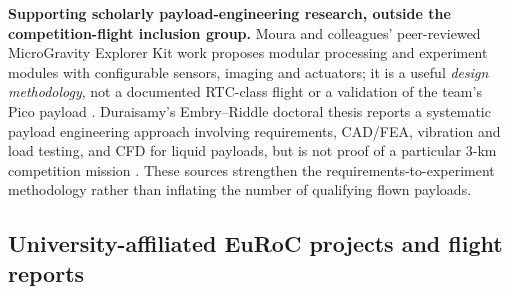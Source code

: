\documentclass[10pt,a4paper]{article}
\begin{document}
\textbf{Supporting scholarly payload-engineering research, outside the competition-flight inclusion group.} Moura and colleagues' peer-reviewed MicroGravity Explorer Kit work proposes modular processing and experiment modules with configurable sensors, imaging and actuators; it is a useful \emph{design methodology}, not a documented RTC-class flight or a validation of the team's Pico payload \cite{moura2024mgx}. Duraisamy's Embry--Riddle doctoral thesis reports a systematic payload engineering approach involving requirements, CAD/FEA, vibration and load testing, and CFD for liquid payloads, but is not proof of a particular 3-km competition mission \cite{duraisamy2021payload}. These sources strengthen the requirements-to-experiment methodology rather than inflating the number of qualifying flown payloads.

\subsection{University-affiliated EuRoC projects and flight reports}
\small
\end{document}
